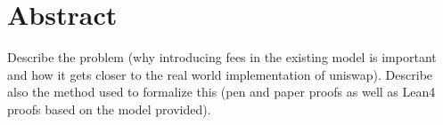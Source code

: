 \section*{Abstract}

Describe the problem (why introducing fees in the existing model is important and how it gets closer to the real world implementation of uniswap). Describe also the method used to formalize this (pen and paper proofs as well as Lean4 proofs based on the model provided). 





